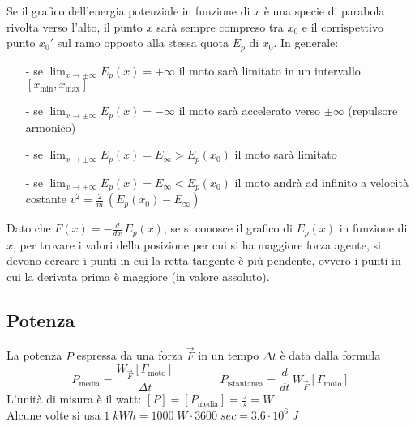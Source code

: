 \documentclass[a4paper]{article}
\newcommand\dt{\frac{d}{dt}\,}
\begin{document}
Se il grafico dell'energia potenziale in funzione di \(x\) è una specie di parabola rivolta verso l'alto, il punto \(x\) sarà
sempre compreso tra \(x_0\) e il corrispettivo punto \(x_0'\) sul ramo opposto alla stessa quota \(E_p\) di \(x_0\).
In generale:
\begin{itemize}[topsep=3pt, itemsep=0pt]
	\item[-] se \(\displaystyle \lim_{x \to \pm \infty} E_p(x) = + \infty\) il moto sarà limitato in un intervallo \([x_\text{min}, x_\text{max}]\)
	\item[-] se \(\displaystyle \lim_{x \to \pm \infty} E_p(x) = - \infty\) il moto sarà accelerato verso \(\pm \infty\) (repulsore armonico)
	\item[-] se \(\displaystyle \lim_{x \to \pm \infty} E_p(x) = E_\infty > E_p(x_0)\) il moto sarà limitato
	\item[-] se \(\displaystyle \lim_{x \to \pm \infty} E_p(x) = E_\infty < E_p(x_0)\) il moto andrà ad infinito a velocità costante \(v^2 = \frac{2}{m} \, (E_p(x_0) - E_\infty)\)
\end{itemize}

Dato che \(F(x) = -\frac{d}{dx} \, E_p(x)\), se si conosce il grafico di \(E_p(x)\) in funzione di \(x\), per trovare i valori
della posizione per cui si ha maggiore forza agente, si devono cercare i punti in cui la retta tangente è più pendente, ovvero
i punti in cui la derivata prima è maggiore (in valore assoluto). 

\subsection{Potenza}
La potenza \(P\) espressa da una forza \(\vec{F}\) in un tempo \(\Delta t\) è data dalla formula
\[P_\text{media} = \frac{W_{\vec{F}}[\Gamma_\text{moto}]}{\Delta t} \qquad \qquad P_\text{istantanea} = \dt W_{\vec{F}}[\Gamma_\text{moto}]\]
L'unità di misura è il watt: \(\displaystyle [P] = [P_\text{media}] = \frac{J}{s} = W\) \\
Alcune volte si usa \(1 \; kWh = 1000 \; W \cdot 3600 \; sec = 3.6 \cdot 10^6 \; J\)
\end{document}
